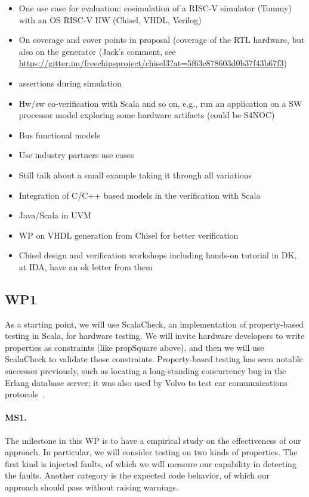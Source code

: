 \documentclass[fleqn,12pt]{article}
\begin{document}
\begin{itemize}
\item One use case for evaluation: cosimulation of a RISC-V simulator (Tommy) with an OS RISC-V HW (Chisel, VHDL, Verilog)
\item On coverage and cover points in proposal (coverage of the RTL hardware, but also on the generator (Jack's comment, see \url{https://gitter.im/freechipsproject/chisel3?at=5f63c878603d0b37f43b67f3})
\item assertions during simulation
\item Hw/sw co-verification with Scala and so on, e.g., run an application on a SW processor model exploring some hardware artifacts (could be S4NOC)
\item Bus functional models
\item Use industry partners use cases
\item Still talk about a small example taking it through all variations
\item Integration of C/C++ based models in the verification with Scala
\item Java/Scala in UVM
\item WP on VHDL generation from Chisel for better verification
\item Chisel design and verification workshops including hands-on tutorial in DK, at IDA, have an ok letter from them
\end{itemize}

\subsection{WP1} 
As a starting point, we will use ScalaCheck, an implementation of
property-based testing in Scala, for hardware testing. We will invite
hardware developers to write properties as constraints (like
propSquare above), and then we will use ScalaCheck to validate those
constraints. Property-based testing has seen notable
successes previously, such as locating a long-standing concurrency bug
in the Erlang database server; it was also used by Volvo to test car
communications protocols~\cite{DBLP:conf/icse/HughesNSA16}.

\paragraph{MS1.} The milestone in this WP is to have a empirical study on the effectiveness of our approach. In particular,  we will consider testing on two kinds of properties. The first kind is injected faults, of which we will measure our capability in detecting the faults. Another category is the expected code behavior, of which our approach should  pass without raising  warnings. 
\end{document}
